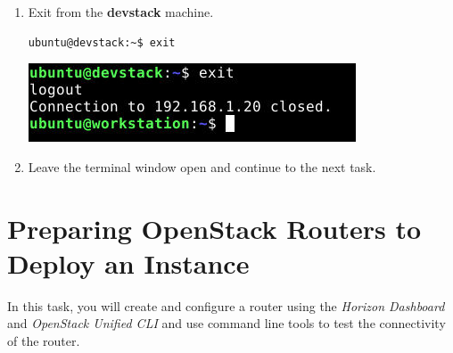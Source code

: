 \documentclass[letterpaper, 12pt]{article}
\begin{document}
\begin{enumerate}
    \item Exit from the \textbf{devstack} machine.
\begin{lstlisting}
ubuntu@devstack:~$ exit
\end{lstlisting}

    \begin{center}
        \includegraphics[width=\linewidth]{images/part1/step17.png}
    \end{center}

    \item Leave the terminal window open and continue to the next task.

\end{enumerate}

\section{Preparing OpenStack Routers to Deploy an Instance}
\label{sec:preparing_openstack_routers_to_deploy_an_instance}
In this task, you will create and configure a router using the \textit{Horizon Dashboard} and \textit{OpenStack Unified
CLI} and use command line tools to test the connectivity of the router.
\end{document}
